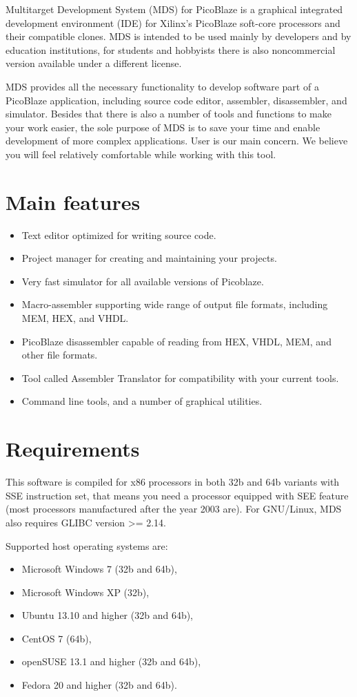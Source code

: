 Multitarget Development System (MDS) for PicoBlaze is a graphical integrated development environment (IDE) for Xilinx's PicoBlaze soft-core processors and their compatible clones. MDS is intended to be used mainly by developers and by education institutions, for students and hobbyists there is also noncommercial version available under a different license.

MDS provides all the necessary functionality to develop software part of a PicoBlaze application, including source code editor, assembler, disassembler, and simulator. Besides that there is also a number of tools and functions to make your work easier, the sole purpose of MDS is to save your time and enable development of more complex applications. User is our main concern. We believe you will feel relatively comfortable while working with this tool.

\section{Main features}
    \begin{itemize}
        \item Text editor optimized for writing source code.
        \item Project manager for creating and maintaining your projects.
        \item Very fast simulator for all available versions of Picoblaze.
        \item Macro-assembler supporting wide range of output file formats, including MEM, HEX, and VHDL.
        \item PicoBlaze disassembler capable of reading from HEX, VHDL, MEM, and other file formats.
        \item Tool called Assembler Translator for compatibility with your current tools.
        \item Command line tools, and a number of graphical utilities.
    \end{itemize}

\clearpage
\section{Requirements}
    This software is compiled for x86 processors in both 32b and 64b variants with SSE instruction set, that means you
    need a processor equipped with SEE feature (most processors manufactured after the year 2003 are). For GNU/Linux,
    MDS also requires GLIBC version >= 2.14.

    Supported host operating systems are:
    \begin{itemize}
        \item Microsoft Windows 7 (32b and 64b),
        \item Microsoft Windows XP (32b),
        \item Ubuntu 13.10 and higher (32b and 64b),
        \item CentOS 7 (64b),
        \item openSUSE 13.1 and higher (32b and 64b),
        \item Fedora 20 and higher (32b and 64b).
    \end{itemize}
